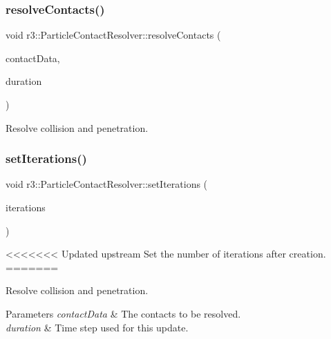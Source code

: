 \subsubsection{\texorpdfstring{resolve\+Contacts()}{resolveContacts()}}
{\footnotesize\ttfamily void r3\+::\+Particle\+Contact\+Resolver\+::resolve\+Contacts (\begin{DoxyParamCaption}\item[{\mbox{\hyperlink{classr3_1_1_fixed_size_container}{Fixed\+Size\+Container}}$<$ \mbox{\hyperlink{classr3_1_1_particle_contact}{Particle\+Contact}} $>$ \&}]{contact\+Data,  }\item[{\mbox{\hyperlink{namespacer3_ab2016b3e3f743fb735afce242f0dc1eb}{real}}}]{duration }\end{DoxyParamCaption})}

Resolve collision and penetration. \mbox{\label{classr3_1_1_particle_contact_resolver_ae82964d26967cb4a3bf73f0c360aa01e}} 
\subsubsection{\texorpdfstring{set\+Iterations()}{setIterations()}}
{\footnotesize\ttfamily void r3\+::\+Particle\+Contact\+Resolver\+::set\+Iterations (\begin{DoxyParamCaption}\item[{unsigned int}]{iterations }\end{DoxyParamCaption})}

<<<<<<< Updated upstream
Set the number of iterations after creation. 
=======

Resolve collision and penetration. 


\begin{DoxyParams}{Parameters}
{\em contact\+Data} & The contacts to be resolved. \\
\hline
{\em duration} & Time step used for this update. \\
\hline
\end{DoxyParams}
\mbox{\label{classr3_1_1_particle_contact_resolver_a631df60543a1709a7c48dcf56490b3d2}} 
